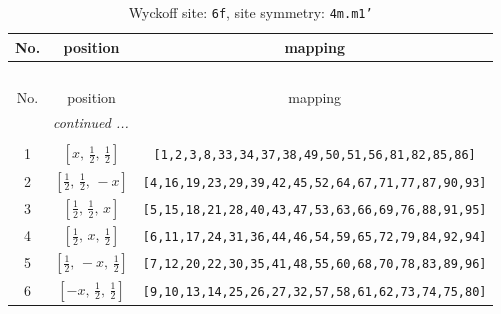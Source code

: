 \documentclass[fleqn,8pt]{jsarticle}
\begin{document}
\begin{longtable}{ccc}
\caption{Wyckoff site: {\tt 6f}, site symmetry: {\tt 4m.m1'}}
 \\
 \hline \hline
No. & position & mapping \\ \hline \endfirsthead

\multicolumn{2}{l}{\tablename\ \thetable{}} \\
 \hline \hline
No. & position & mapping \\ \hline \endhead

 \hline \hline
\multicolumn{2}{r}{\footnotesize\it continued ...} \\ \endfoot

 \hline \hline
\multicolumn{2}{r}{} \\ \endlastfoot

1 & $\left[ x,\, \frac{1}{2},\, \frac{1}{2} \right]$ & {\tt [1,2,3,8,33,34,37,38,49,50,51,56,81,82,85,86]} \\ \hline
2 & $\left[ \frac{1}{2},\, \frac{1}{2},\, - x \right]$ & {\tt [4,16,19,23,29,39,42,45,52,64,67,71,77,87,90,93]} \\ \hline
3 & $\left[ \frac{1}{2},\, \frac{1}{2},\, x \right]$ & {\tt [5,15,18,21,28,40,43,47,53,63,66,69,76,88,91,95]} \\ \hline
4 & $\left[ \frac{1}{2},\, x,\, \frac{1}{2} \right]$ & {\tt [6,11,17,24,31,36,44,46,54,59,65,72,79,84,92,94]} \\ \hline
5 & $\left[ \frac{1}{2},\, - x,\, \frac{1}{2} \right]$ & {\tt [7,12,20,22,30,35,41,48,55,60,68,70,78,83,89,96]} \\ \hline
6 & $\left[ - x,\, \frac{1}{2},\, \frac{1}{2} \right]$ & {\tt [9,10,13,14,25,26,27,32,57,58,61,62,73,74,75,80]} \\
\end{longtable}
\renewcommand{\arraystretch}{1.2}
\end{document}
